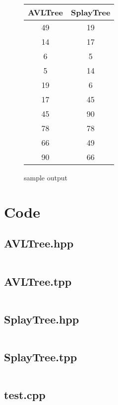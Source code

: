 \documentclass[a4paper,12pt,danish]{article}
\begin{document}
\begin{figure}[H]
\centering
\begin{tabular}{|c|c|}
  \hline
  AVLTree & SplayTree \\
  \hline
  49 & 19 \\
  \hline
  14 & 17 \\
  \hline
  6 & 5 \\
  \hline
  5 & 14 \\
  \hline
  19 & 6 \\
  \hline
  17 & 45 \\
  \hline
  45 & 90 \\
  \hline
  78 & 78 \\
  \hline
  66 & 49 \\
  \hline
  90 & 66 \\
  \hline 
\end{tabular}
\caption{sample output}
\end{figure}

\section{Code}
\subsection*{AVLTree.hpp}
\inputminted[frame=bottomline, linenos, breaklines]{cpp}{"../code/headers/AVLTree.hpp"}

\subsection*{AVLTree.tpp}
\inputminted[frame=bottomline, linenos, breaklines]{cpp}{"../code/headers/AVLTree.tpp"}

\subsection*{SplayTree.hpp}
\inputminted[frame=bottomline, linenos, breaklines]{cpp}{"../code/headers/SplayTree.hpp"}

\subsection*{SplayTree.tpp}
\inputminted[frame=bottomline, linenos, breaklines]{cpp}{"../code/headers/SplayTree.tpp"}

\subsection*{test.cpp}
\inputminted[frame=bottomline, linenos, breaklines]{cpp}{"../code/sources/test.cpp"}
\end{document}
